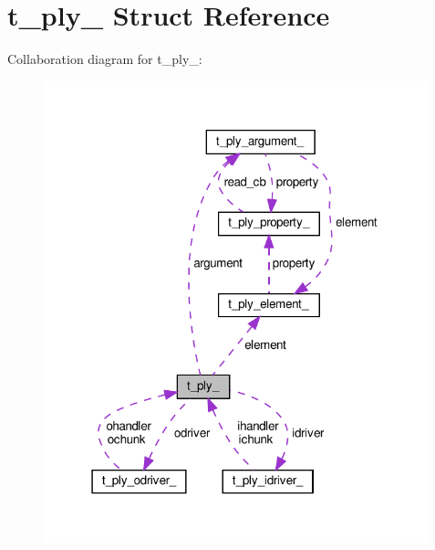 \hypertarget{structt__ply__}{}\section{t\+\_\+ply\+\_\+ Struct Reference}
\label{structt__ply__}


Collaboration diagram for t\+\_\+ply\+\_\+\+:\nopagebreak
\begin{figure}[H]
\begin{center}
\leavevmode
\includegraphics[width=316pt]{structt__ply____coll__graph}
\end{center}
\end{figure}
